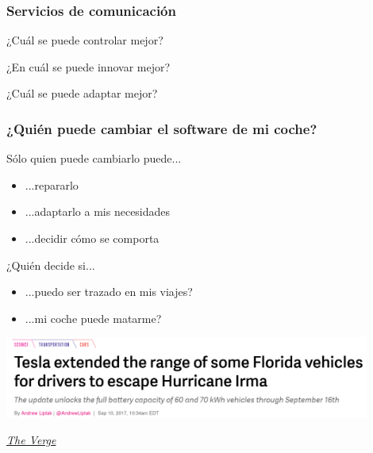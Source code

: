 \documentclass[17pt,aspectratio=169]{beamer}
\begin{document}
\begin{frame}
\frametitle{Servicios de comunicación}

\begin{flushright}
  {\Large
    ¿Cuál se puede controlar mejor? \\

    \vspace{.5cm}
    
    ¿En cuál se puede innovar mejor? \\

    \vspace{.5cm}

    ¿Cuál se puede adaptar mejor? \\
  }
    \end{flushright}

\end{frame}


\begin{frame}
\frametitle{¿Quién puede cambiar el software de mi coche?}

Sólo quien puede cambiarlo puede...

\begin{itemize}
\item ...repararlo
\item ...adaptarlo a mis necesidades
\item ...decidir cómo se comporta
\end{itemize}

¿Quién decide si...

\begin{itemize}
\item ...puedo ser trazado en mis viajes?
\item ...mi coche puede matarme?
\end{itemize}

\end{frame}

\begin{frame}[fragile]

  \begin{center}
  \includegraphics[width=12cm]{figs/tesla}
  \end{center}

  \begin{flushright}
    {\em
      \href{https://www.theverge.com/2017/9/10/16283330/tesla-hurricane-irma-update-florida-extend-range-model-s-x-60-60d}{The Verge} \\
      }
  \end{flushright}
  
\end{frame}
\end{document}
